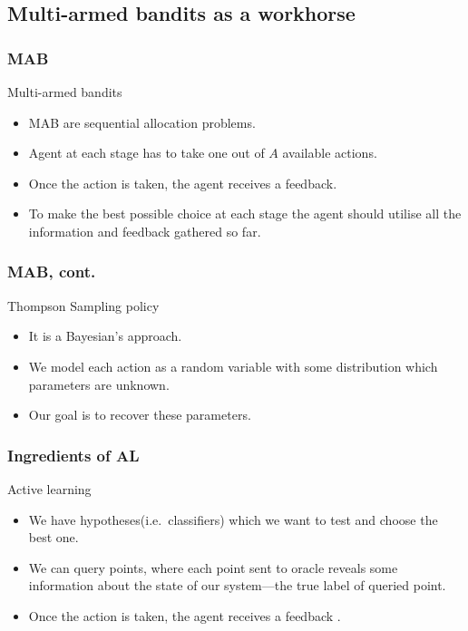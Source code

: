 \documentclass{beamer}
\begin{document}
\subsection{Multi-armed bandits as a workhorse}
  \begin{frame}
  \frametitle{MAB}
  \begin{block}{Multi-armed bandits}
    \begin{itemize}
      \item MAB are sequential allocation problems.
      \item Agent at each stage has to take one out of $A$ available actions.
      \item Once the action is taken, the agent receives a feedback.
      \item To make the best possible choice at each stage the agent should utilise all the information and feedback gathered so far.
    \end{itemize}
  \end{block}
  \end{frame}
  \begin{frame}
  \frametitle{MAB, cont.}
  \begin{block}{Thompson Sampling policy}
    \begin{itemize}
      \item It is a Bayesian's approach.
      \item We model each action as a random variable with some distribution which parameters are unknown.
      \item Our goal is to recover these parameters.
      
    \end{itemize}
  \end{block}
  \end{frame}

  \begin{frame}
  \frametitle{Ingredients of AL}
  \begin{block}{Active learning}
    \begin{itemize}
      \item We have hypotheses(i.e.\ classifiers) which we want to test and choose the best one.
      \item We can query points, where each point sent to oracle reveals some information about the state of our system---the true label of queried point.
      \item Once the action is taken, the agent receives a feedback .
    \end{itemize}
  \end{block}
  \end{frame}
\end{document}
